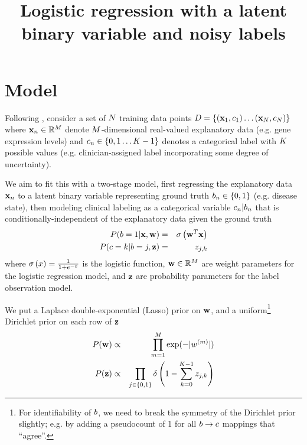 \documentclass{article}
\begin{document}

\title{Logistic regression with a latent binary variable and noisy labels}

\maketitle

\section{Model}

Following \cite{BootkrajangKaban2012},
consider a set of $N$ training data points
$D = \left\{ ({\bf x}_1,c_1) \ldots ({\bf x}_N,c_N) \right\}$
where
${\bf x}_n \in \mathbb{R}^M$
denote $M$-dimensional real-valued explanatory data (e.g. gene expression levels)
and
$c_n \in \left\{ 0, 1 \ldots K - 1 \right\}$
denotes a categorical label with $K$ possible values
(e.g. clinician-assigned label incorporating some degree of uncertainty).

We aim to fit this with a two-stage model,
first regressing the explanatory data ${\bf x}_n$ to a latent binary variable representing ground truth
$b_n \in \left\{ 0, 1 \right\}$
(e.g. disease state),
then modeling clinical labeling as a categorical variable $c_n | b_n$
that is conditionally-independent of the explanatory data given the ground truth
\begin{eqnarray*}
P(b = 1 | {\bf x}, {\bf w}) & = & \sigma\left({\bf w}^T {\bf x}\right) \\
P(c = k | b = j, {\bf z}) & = & z_{j,k}
\end{eqnarray*}
where
$\sigma\left(x\right) = \frac{1}{1+e^{-x}}$ is the logistic function,
${\bf w} \in \mathbb{R}^M$ are weight parameters for the logistic regression model, and
${\bf z}$ are probability parameters for the label observation model.

We put a Laplace double-exponential (Lasso) prior on ${\bf w}$, and a uniform\footnote{
  For identifiability of $b$, we need to break the symmetry of the Dirichlet prior slightly;
  e.g. by adding a pseudocount of 1 for all $b \to c$ mappings that ``agree''.
} Dirichlet prior on each row of ${\bf z}$
\begin{eqnarray*}
P({\bf w}) & \propto & \prod_{m=1}^{M} \exp(-|w^{(m)}|) \\
P({\bf z}) & \propto & \prod_{j \in \{0,1\}} \delta \left( 1 - \sum_{k=0}^{K-1} z_{j,k} \right)
\end{eqnarray*}
\end{document}
